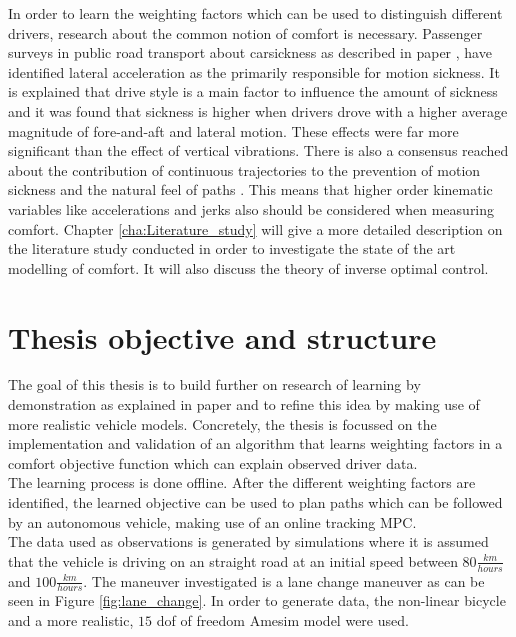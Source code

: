 In order to learn the weighting factors which can be used to distinguish different drivers, research about the common notion of comfort is necessary. Passenger surveys in public road transport about carsickness as described in paper \cite{Turner1999}, have identified lateral acceleration as the primarily responsible for motion sickness. It is explained that drive style is a main factor to influence the amount of sickness and it was found that sickness is higher when drivers drove with a higher average magnitude of fore-and-aft and lateral motion. These effects were far more significant than the effect of vertical vibrations. There is also a consensus reached about the contribution of continuous trajectories to the prevention of motion sickness and the natural feel of paths \cite{Elbanhawi2015}. This means that higher order kinematic variables like accelerations and jerks also should be considered when measuring comfort. Chapter \ref{cha:Literature_study} will give a more detailed description on the literature study conducted in order to investigate the state of the art modelling of comfort. It will also discuss the theory of inverse optimal control.\\

\section{Thesis objective and structure}
The goal of this thesis is to build further on research of learning by demonstration as explained in paper \cite{Kuderer2015a} and to refine this idea by making use of more realistic vehicle models. Concretely, the thesis is focussed on the implementation and validation of an algorithm that learns weighting factors in a comfort objective function which can explain observed driver data.\\
The learning process is done offline. After the different weighting factors are identified, the learned objective can be used to plan paths which can be followed by an autonomous vehicle, making use of an online tracking MPC.\\

The data used as observations is generated by simulations where it is assumed that the vehicle is driving on an straight road at an initial speed between $80\frac{km}{hours}$ and $100\frac{km}{hours}$. The maneuver investigated is a lane change maneuver as can be seen in Figure \ref{fig:lane_change}. In order to generate data, the non-linear bicycle and a more realistic, $15$ dof of freedom Amesim model were used.\\

